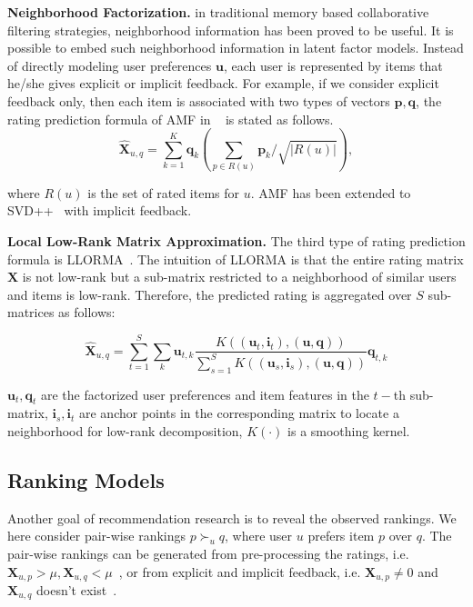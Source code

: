 \documentclass[letterpaper]{article} %
\newcommand{\Rating}{\mathbf{X}}
\begin{document}
\textbf{Neighborhood Factorization.}  in traditional memory based collaborative filtering strategies, neighborhood information has been proved to be useful. It is possible  to embed such neighborhood information in latent factor models. Instead of directly modeling user preferences $\mathbf{u}$, each user is represented by items that he/she gives explicit or implicit feedback. For example, if we consider explicit feedback only, then each item is associated with two types of vectors $\mathbf{p},\mathbf{q}$, the rating prediction formula of AMF in ~\cite{Koren2008Factorization} is stated as follows.  
 \begin{equation}\label{equ:AMF}
\hat{\Rating}_{u,q}=\sum_{k=1}^{K} \mathbf{q}_{k} (\sum_{p \in R(u)} \mathbf{p}_k/\sqrt{|R(u)|} ),
\end{equation}

where  $R(u)$ is the set of rated items for $u$. AMF has been extended to SVD++~\cite{Koren2008Factorization} with implicit feedback. 

\textbf{Local Low-Rank Matrix Approximation.} The third type of rating prediction formula is  LLORMA~\cite{Lee2013Local}. The intuition of LLORMA is that the entire rating matrix $\Rating$ is not low-rank but a sub-matrix restricted to a neighborhood of similar users and items is low-rank.  Therefore, the predicted rating is aggregated over $S$ sub-matrices  as follows:

\begin{equation}\label{equ:LLORMA}
\hat{\Rating}_{u,q} = \sum_{t=1}^{S} \sum_k \mathbf{u}_{t, k} \frac{K((\mathbf{u}_t,\mathbf{i}_t),(\mathbf{u},\mathbf{q}))}{\sum_{s=1}^{S} K((\mathbf{u}_s,\mathbf{i}_s),(\mathbf{u},\mathbf{q}))} \mathbf{q}_{t,k}
\end{equation}

$\mathbf{u}_t, \mathbf{q}_t$ are the factorized user preferences and item features in the $t-$th sub-matrix,  $\mathbf{i}_s,\mathbf{i}_t$ are anchor points in the corresponding matrix to locate a neighborhood for low-rank decomposition, $K(\cdot)$ is a smoothing kernel. 


\subsection{Ranking Models}
Another goal of recommendation research is to reveal the observed rankings. We here consider pair-wise rankings $p\succ_u q$, where user $u$ prefers item $p$ over $q$. The pair-wise rankings can be generated from pre-processing  the ratings, i.e. $\Rating_{u,p}> \mu, \Rating_{u,q}<\mu$~\cite{Hu2017Decoupled}, or from explicit and implicit feedback, i.e. $\Rating_{u,p}\neq 0$ and $ \Rating_{u,q}$ doesn't exist~\cite{Rendle2009BPR}. 
\end{document}
